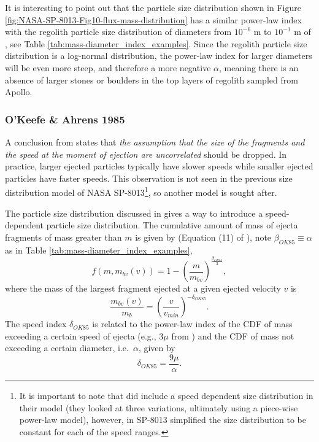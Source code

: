 \documentclass{article}
\begin{document}
It is interesting to point out that the particle size distribution shown in Figure \ref{fig:NASA-SP-8013-Fig10-flux-mass-distribution} has a similar power-law index with the regolith particle size distribution of diameters from $10^{-6}$ m to $10^{-1}$ m of \cite{carrier2003particle}, see Table \ref{tab:mass-diameter_index_examples}. Since the regolith particle size distribution is a log-normal distribution, the power-law index for larger diameters will be even more steep, and therefore a more negative $\alpha$, meaning there is an absence of larger stones or boulders in the top layers of regolith sampled from Apollo.

\subsubsection{O'Keefe \& Ahrens 1985}\label{sssec:OKeefe Ahrens 1985}
A conclusion from \cite{sachse2015correlation} states that \textit{the assumption that the size of the fragments and the speed at the moment of ejection are uncorrelated} should be dropped. In practice, larger ejected particles typically have slower speeds while smaller ejected particles have faster speeds. This observation is not seen in the previous size distribution model of NASA SP-8013\footnote{It is important to note that \cite{zook1967problem} did include a speed dependent size distribution in their model (they looked at three variations, ultimately using a piece-wise power-law model), however, \cite{cour1969meteoroid} in SP-8013 simplified the size distribution to be constant for each of the speed ranges.}, so another model is sought after.

The particle size distribution discussed in \cite{oKeefe1985impact} gives a way to introduce a speed-dependent particle size distribution. The cumulative amount of mass of ejecta fragments of mass greater than $m$ is given by (Equation (11) of \cite{oKeefe1985impact}), note $\beta_{OK85} \equiv \alpha$ as in Table \ref{tab:mass-diameter_index_examples},
\begin{equation}\label{eq:f(m,mbv)}
f(m, m_{bv}(v)) = 1 - \left(\frac{m}{m_{bv}}\right)^{\frac{\beta_{OK85}}{3}},
\end{equation}
where the mass of the largest fragment ejected at a given ejected velocity $v$ is
\begin{equation}
\frac{m_{bv}(v)}{m_b} = \left(\frac{v}{v_{min}}\right)^{-\delta_{OK85}}.
\end{equation}
The speed index $\delta_{OK85}$ is related to the power-law index of the CDF of mass exceeding a certain speed of ejecta (e.g., $3\mu$ from \cite{housen2011ejecta}) and the CDF of mass not exceeding a certain diameter, i.e.\ $\alpha$, given by
\begin{equation}
\delta_{OK85} = \frac{9\mu}{\alpha}.
\end{equation}
\end{document}
